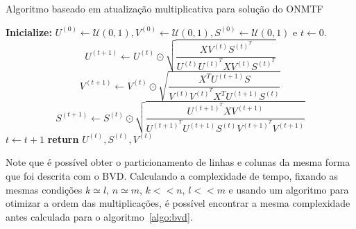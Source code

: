\documentclass[
    12pt,                %
    oneside,            %
    a4paper,            %
    english,            %
    brazil                %
    ]{abntex2ppgsi}
\begin{document}

\begin{algorithm}
\caption{Algoritmo baseado em atualização multiplicativa para solução do ONMTF}
\label{algo:onmtf}
\begin{algorithmic}[1]
\State \textbf{Inicialize:} $U^{(0)} \gets \mathcal{U}(0, 1), V^{(0)} \gets \mathcal{U}(0, 1), S^{(0)} \gets \mathcal{U}(0, 1)$ e $t \gets 0$.
\State
\begin{equation}
\label{eq:onmtf:updateU}
U^{(t+1)} \gets U^{(t)} \odot \sqrt{ \frac{ X V^{(t)} S^{(t)^T} }{ U^{(t)} U^{(t)^T} X V^{(t)} S^{(t)^T} } }
\end{equation}
\State
\begin{equation}
\label{eq:onmtf:updateV}
V^{(t+1)} \gets V^{(t)} \odot \sqrt{ \frac{ X^T U^{(t+1)} S }{ V^{(t)} V^{(t)^T} X^T U^{(t+1)} S^{(t)} } }
\end{equation}
\State
\begin{equation}
\label{eq:onmtf:updateS}
S^{(t+1)} \gets S^{(t)} \odot \sqrt{ \frac{ U^{(t+1)^T} X V^{(t+1)} }{ U^{(t+1)^T} U^{(t+1)} S^{(t)} V^{(t+1)^T} V^{(t+1)} } }
\end{equation}
\State $t \gets t + 1$
\EndWhile\label{euclidendwhile}
\State \textbf{return} $U^{(t)}, S^{(t)}, V^{(t)}$
\EndFunction
\end{algorithmic}
\end{algorithm}

Note que é possível obter o particionamento de linhas e colunas da mesma forma que foi descrita com o BVD.
Calculando a complexidade de tempo, fixando as mesmas condições $k \simeq l$, $n \simeq m$, $k << n$, $l << m$ e usando um algoritmo para otimizar a ordem das multiplicações, é possível encontrar a mesma complexidade antes calculada para o algoritmo~\ref{algo:bvd}.

\end{document}
